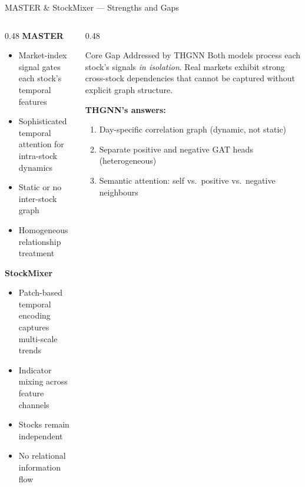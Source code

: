 \documentclass[aspectratio=169, 10pt]{beamer}
\newcommand{\xmark}{\textcolor{negative}{\textbf{\texttimes}}}
\begin{document}
\begin{frame}{MASTER \& StockMixer — Strengths and Gaps}
  \begin{columns}[T]
    \begin{column}{0.48\textwidth}
      \textbf{MASTER}
      \begin{itemize}\setlength{\itemsep}{1pt}
        \item Market-index signal gates each stock's temporal features
        \item Sophisticated temporal attention for intra-stock dynamics
        \item[\xmark] \textcolor{negative}{Static or no inter-stock graph}
        \item[\xmark] \textcolor{negative}{Homogeneous relationship treatment}
      \end{itemize}
      \smallskip
      \textbf{StockMixer}
      \begin{itemize}\setlength{\itemsep}{1pt}
        \item Patch-based temporal encoding captures multi-scale trends
        \item Indicator mixing across feature channels
        \item[\xmark] \textcolor{negative}{Stocks remain independent}
        \item[\xmark] \textcolor{negative}{No relational information flow}
      \end{itemize}
    \end{column}
    \begin{column}{0.48\textwidth}
      \begin{alertblock}{Core Gap Addressed by THGNN}
        Both models process each stock's signals \emph{in isolation}.
        Real markets exhibit strong cross-stock dependencies that cannot
        be captured without explicit graph structure.
      \end{alertblock}
      \smallskip
      \textbf{THGNN's answers:}
      \begin{enumerate}\setlength{\itemsep}{2pt}
        \item Day-specific correlation graph (dynamic, not static)
        \item Separate \textcolor{positive}{positive} and
              \textcolor{negative}{negative} GAT heads (heterogeneous)
        \item Semantic attention: self vs.\ positive vs.\ negative neighbours
      \end{enumerate}
    \end{column}
  \end{columns}
\end{frame}
\end{document}

